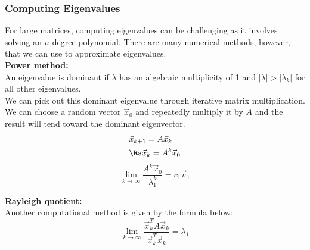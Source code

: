 \subsubsection{Computing Eigenvalues}
For large matrices, computing eigenvalues can be challenging as it involves solving an $n$ degree polynomial. There are many numerical methods, however, that we can use to approximate eigenvalues.\\

\textbf{Power method:}\\
An eigenvalue is dominant if $\lambda$ has an algebraic multiplicity of 1 and $|\lambda|>|\lambda_k|$ for all other eigenvalues.\\
We can pick out this dominant eigenvalue through iterative matrix multiplication.\\
We can choose a random vector $\vec{x}_0$ and repeatedly multiply it by $A$ and the result will tend toward the dominant eigenvector.
\begin{align*}
    &\vec{x}_{k+1}=A\vec{x}_k\\
    &\Ra \vec{x}_k=A^k\vec{x}_0
\end{align*}
$$\lim_{k\to\infty}\frac{A^k\vec{x}_0}{\lambda_1^k}=c_1\vec{v}_1$$

\textbf{Rayleigh quotient:}\\
Another computational method is given by the formula below:
$$\lim_{k\to\infty}\frac{\vec{x}_k^TA\vec{x}_k}{\vec{x}_k^T\vec{x}_k}=\lambda_1$$
